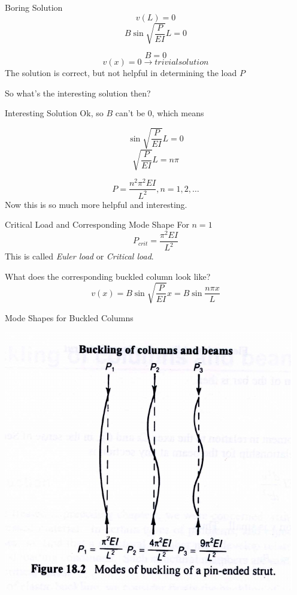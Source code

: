 \documentclass[10pt, svgnames]{beamer}
\begin{document}
\begin{frame}[label={sec:org4d9a58c}]{Boring Solution}
$$ v(L) = 0 $$
$$ B \sin  \sqrt{\frac{P}{EI}}   L = 0 $$

$$ B = 0 $$
$$ v(x) = 0 \rightarrow trivial   solution $$
The solution is correct, but not helpful in determining the load \(P\)

So what's the interesting solution then?
\end{frame}

\begin{frame}[label={sec:orge7e0d72}]{Interesting Solution}
Ok, so \(B\) can't be 0, which means

$$  \sin  \sqrt{\frac{P}{EI}}   L = 0  $$
$$  \sqrt{\frac{P}{EI}}   L = n\pi $$

$$ P = \dfrac{n^2 \pi^2 E I}{L^2}, n = 1, 2, \dots $$
Now this is so much more helpful and interesting.
\end{frame}

\begin{frame}[label={sec:org26bef01}]{Critical Load and Corresponding Mode Shape}
For \(n = 1\)
$$ P_{crit} = \dfrac{\pi^2 E I}{L^2} $$
This is called \emph{Euler load} or \emph{Critical load}.

What does the corresponding buckled column look like?
$$ v(x) = B \sin \sqrt{\frac{P}{EI}}   x = B \sin \dfrac{n \pi x}{L} $$
\end{frame}

\begin{frame}[label={sec:org75158ae}]{Mode Shapes for Buckled Columns}
\begin{center}
\includegraphics[width=.9\linewidth]{pictures/buckling-mode.pdf}
\end{center}
\end{frame}
\end{document}
